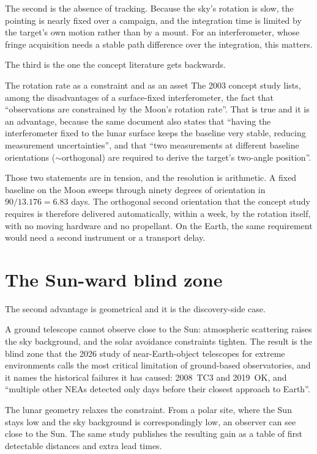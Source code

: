 The second is the absence of tracking. Because the sky's rotation is slow,
the pointing is nearly fixed over a campaign, and the integration time is
limited by the target's own motion rather than by a mount. For an
interferometer, whose fringe acquisition needs a stable path difference over
the integration, this matters.

The third is the one the concept literature gets backwards.

\begin{deeper}{The rotation rate as a constraint and as an asset}
The 2003 concept study lists, among the disadvantages of a surface-fixed
interferometer, the fact that ``observations are constrained by the Moon's
rotation rate''. That is true and it is an advantage, because the same
document also states that ``having the interferometer fixed to the lunar
surface keeps the baseline very stable, reducing measurement uncertainties'',
and that ``two measurements at different baseline orientations
(\(\sim\)orthogonal) are required to derive the target's two-angle
position''.

Those two statements are in tension, and the resolution is arithmetic. A
fixed baseline on the Moon sweeps through ninety degrees of orientation in
\(90/13.176 = 6.83\) days. The orthogonal second orientation that the
concept study requires is therefore delivered automatically, within a week,
by the rotation itself, with no moving hardware and no propellant. On the
Earth, the same requirement would need a second instrument or a transport
delay.
\end{deeper}

\section{The Sun-ward blind zone}

The second advantage is geometrical and it is the discovery-side case.

A ground telescope cannot observe close to the Sun: atmospheric scattering
raises the sky background, and the solar avoidance constraints tighten. The
result is the blind zone that the 2026 study of near-Earth-object telescopes
for extreme environments calls the most critical limitation of ground-based
observatories, and it names the historical failures it has caused: 2008~TC3
and 2019~OK, and ``multiple other NEAs detected only days before their
closest approach to Earth''.

The lunar geometry relaxes the constraint. From a polar site, where the Sun
stays low and the sky background is correspondingly low, an observer can see
close to the Sun. The same study publishes the resulting gain as a table of
first detectable distances and extra lead times.

